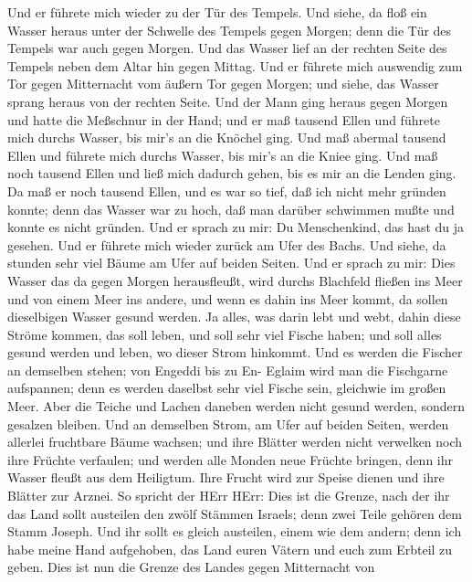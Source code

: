  Und er führete mich wieder zu der Tür des Tempels. Und
siehe, da floß ein Wasser heraus unter der Schwelle des Tempels gegen
Morgen; denn die Tür des Tempels war auch gegen Morgen. Und das Wasser
lief an der rechten Seite des Tempels neben dem Altar hin gegen Mittag.
 Und er führete mich auswendig zum Tor gegen Mitternacht vom
äußern Tor gegen Morgen; und siehe, das Wasser sprang heraus von der
rechten Seite.  Und der Mann ging heraus gegen Morgen und
hatte die Meßschnur in der Hand; und er maß tausend Ellen und führete
mich durchs Wasser, bis mir's an die Knöchel ging.  Und maß
abermal tausend Ellen und führete mich durchs Wasser, bis mir's an die
Kniee ging. Und maß noch tausend Ellen und ließ mich dadurch gehen, bis
es mir an die Lenden ging.  Da maß er noch tausend Ellen,
und es war so tief, daß ich nicht mehr gründen konnte; denn das Wasser
war zu hoch, daß man darüber schwimmen mußte und konnte es nicht
gründen.  Und er sprach zu mir: Du Menschenkind, das hast du
ja gesehen. Und er führete mich wieder zurück am Ufer des Bachs.
 Und siehe, da stunden sehr viel Bäume am Ufer auf beiden
Seiten.  Und er sprach zu mir: Dies Wasser das da gegen
Morgen herausfleußt, wird durchs Blachfeld fließen ins Meer und von
einem Meer ins andere, und wenn es dahin ins Meer kommt, da sollen
dieselbigen Wasser gesund werden.  Ja alles, was darin lebt
und webt, dahin diese Ströme kommen, das soll leben, und soll sehr viel
Fische haben; und soll alles gesund werden und leben, wo dieser Strom
hinkommt.  Und es werden die Fischer an demselben stehen;
von Engeddi bis zu En- Eglaim wird man die Fischgarne aufspannen; denn
es werden daselbst sehr viel Fische sein, gleichwie im großen Meer.
 Aber die Teiche und Lachen daneben werden nicht gesund
werden, sondern gesalzen bleiben.  Und an demselben Strom,
am Ufer auf beiden Seiten, werden allerlei fruchtbare Bäume wachsen; und
ihre Blätter werden nicht verwelken noch ihre Früchte verfaulen; und
werden alle Monden neue Früchte bringen, denn ihr Wasser fleußt aus dem
Heiligtum. Ihre Frucht wird zur Speise dienen und ihre Blätter zur
Arznei.  So spricht der HErr HErr: Dies ist die Grenze,
nach der ihr das Land sollt austeilen den zwölf Stämmen Israels; denn
zwei Teile gehören dem Stamm Joseph.  Und ihr sollt es
gleich austeilen, einem wie dem andern; denn ich habe meine Hand
aufgehoben, das Land euren Vätern und euch zum Erbteil zu geben.
 Dies ist nun die Grenze des Landes gegen Mitternacht von
